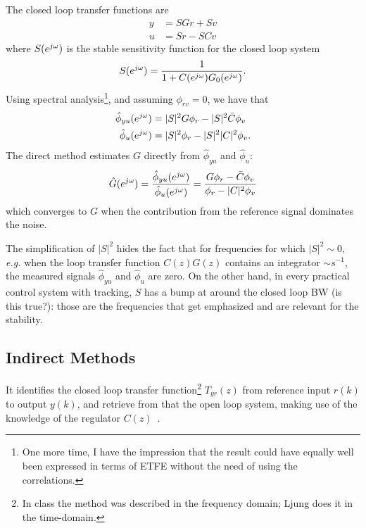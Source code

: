 The closed loop transfer functions are
\begin{equation*}
  \begin{aligned}
    y &= SGr + Sv \\
    u &= Sr - SCv
  \end{aligned}
\end{equation*}
where $S(e^{j\omega})$ is the stable sensitivity function for the closed loop system
\begin{equation*}
  S(e^{j\omega}) = \frac{1}{1+C(e^{j\omega})G_0(e^{j\omega})}.
\end{equation*}
Using spectral analysis\footnote{One more time, I have the impression that the result could have equally well been expressed in terms of ETFE without the need of using the correlations.}, and assuming $\phi_{rv}=0$, we have that
\begin{align*}
  \hat{\phi}_{yu}(e^{j\omega}) &= |S|^2G\phi_r - |S|^2\bar{C}\phi_v \\
  \hat{\phi}_u(e^{j\omega}) &= |S|^2\phi_r - |S|^2|C|^2\phi_v.
\end{align*}
The direct method estimates $G$ directly from $\hat{\phi}_{yu}$ and $\hat{\phi}_u$:
\begin{equation*}
  \hat{G}(e^{j\omega}) = \frac{\hat{\phi}_{yu}(e^{j\omega})}{\hat{\phi}_u(e^{j\omega})} = \frac{G\phi_r - \bar{C}\phi_v}{\phi_r - |C|^2\phi_v}
\end{equation*}
which converges to $G$ when the contribution from the reference signal dominates the noise.

The simplification of $|S|^2$ hides the fact that for frequencies for which $|S|^2\sim 0$, \textit{e.g.} when the loop transfer function $C(z)G(z)$ contains an integrator $\sim s^{-1}$, the measured signals $\hat{\phi}_{yu}$ and $\hat{\phi}_u$ are zero. On the other hand, in every practical control system with tracking, $S$ has a bump at around the closed loop BW (is this true?): those are the frequencies that get emphasized and are relevant for the stability.

\subsection{Indirect Methods}
\label{sec:indirect-methods}

It identifies the closed loop transfer function\footnote{In class the method was described in the frequency domain; Ljung does it in the time-domain.} $T_{yr}(z)$ from reference input $r(k)$ to output $y(k)$, and retrieve from that the open loop system, making use of the knowledge of the regulator $C(z)$~\cite{ljung}.

